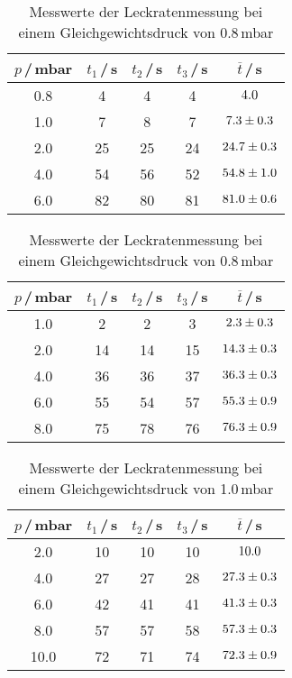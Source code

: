 \begin{table}
  \begin{minipage}{0.45\textwidth}
    \centering
    \caption{Messwerte der Leckratenmessung bei\\ einem Gleichgewichtsdruck von 0.6\,mbar}
    \begin{tabular}{c|c|c|c|c}\label{tab:Leck0.6Dreh}
      $p$\,/\,mbar & $t_1$\,/\,s & $t_2$\,/\,s & $t_3$\,/\,s & $\overline{t}$\,/\,s \\
      \hline
      0.8 & 4  & 4  & 4  & $\num{4.0 +- 0.0}$ \\
      1.0 & 7  & 8  & 7  & $\num{7.3 +- 0.3}$ \\
      2.0 & 25 & 25 & 24 & $\num{24.7 +- 0.3}$ \\
      4.0 & 54 & 56 & 52 & $\num{54.8 +- 1.0}$ \\
      6.0 & 82 & 80 & 81 & $\num{81.0 +- 0.6}$ \\
    \end{tabular}
  \end{minipage}\hfill
  \begin{minipage}{0.45\textwidth}
    \centering
    \caption{Messwerte der Leckratenmessung bei\\ einem Gleichgewichtsdruck von 0.8\,mbar}
    \begin{tabular}{c|c|c|c|c}\label{tab:Leck0.8Dreh}
      $p$\,/\,mbar & $t_1$\,/\,s & $t_2$\,/\,s & $t_3$\,/\,s & $\overline{t}$\,/\,s \\
      \hline
      1.0 & 2  & 2  & 3  & $\num{2.3 +- 0.3}$ \\
      2.0 & 14 & 14 & 15 & $\num{14.3 +- 0.3}$ \\
      4.0 & 36 & 36 & 37 & $\num{36.3 +- 0.3}$ \\
      6.0 & 55 & 54 & 57 & $\num{55.3 +- 0.9}$ \\
      8.0 & 75 & 78 & 76 & $\num{76.3 +- 0.9}$ \\
    \end{tabular}
  \end{minipage}
\end{table}

\begin{table}
  \centering
  \caption{Messwerte der Leckratenmessung bei\\ einem Gleichgewichtsdruck von 1.0\,mbar}
  \begin{tabular}{c|c|c|c|c}\label{tab:Leck1.0Dreh}
    $p$\,/\,mbar & $t_1$\,/\,s & $t_2$\,/\,s & $t_3$\,/\,s & $\overline{t}$\,/\,s \\
    \hline
    2.0  & 10 & 10 & 10 & $\num{10.0 +- 0.0}$ \\
    4.0  & 27 & 27 & 28 & $\num{27.3 +- 0.3}$ \\
    6.0  & 42 & 41 & 41 & $\num{41.3 +- 0.3}$ \\
    8.0  & 57 & 57 & 58 & $\num{57.3 +- 0.3}$ \\
    10.0 & 72 & 71 & 74 & $\num{72.3 +- 0.9}$ \\
  \end{tabular}
\end{table}

